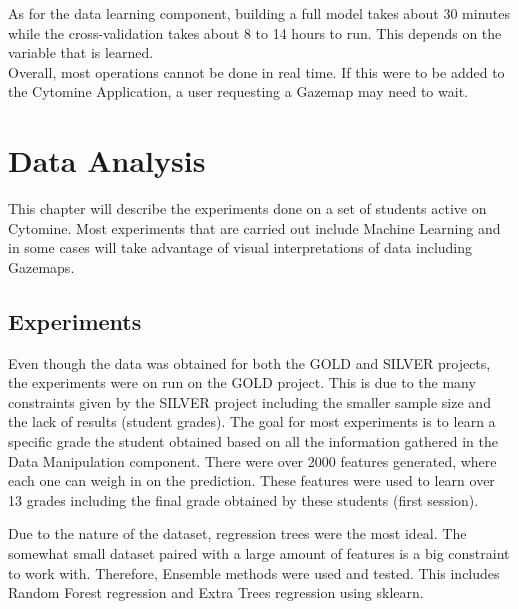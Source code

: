 \documentclass[a4paper,11pt]{report}
\numberwithin{figure}{chapter} %
\begin{document}
    As for the data learning component, building a full model takes about 30 minutes while the cross-validation takes about 8 to 14 hours to run.
    This depends on the variable that is learned. \\

    Overall, most operations cannot be done in real time.
    If this were to be added to the Cytomine Application, a user requesting a Gazemap may need to wait.

\chapter{Data Analysis}

    This chapter will describe the experiments done on a set of students active on Cytomine.
    Most experiments that are carried out include Machine Learning and in some cases will take advantage of visual interpretations of data including Gazemaps.

	\section{Experiments} \label{experiments}


    Even though the data was obtained for both the GOLD and SILVER projects, the experiments were on run on the GOLD project.
    This is due to the many constraints given by the SILVER project including the smaller sample size and the lack of results (student grades).
    The goal for most experiments is to learn a specific grade the student obtained based on all the information gathered in the Data Manipulation component.
    There were over 2000 features generated, where each one can weigh in on the prediction.
    These features were used to learn over 13 grades including the final grade obtained by these students (first session).\newline


    Due to the nature of the dataset, regression trees were the most ideal.
    The somewhat small dataset paired with a large amount of features is a big constraint to work with.
    Therefore, Ensemble methods were used and tested.
    This includes Random Forest regression and Extra Trees regression using sklearn.\newline
\end{document}
